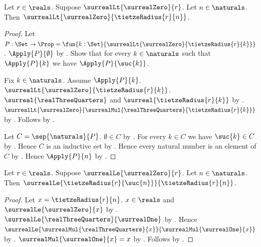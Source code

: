 \begin{theorem}\label{tietze_radius_positive}
    Let $r\in\reals$.
    Suppose $\surrealLt{\surrealZero}{r}$.
    Let $n\in\naturals$.
    Then $\surrealLt{\surrealZero}{\tietzeRadius{r}{n}}$.
\end{theorem}
\begin{proof}
    Let $P:\Set\to\Prop=\fun{k:\Set}{
        \surrealLt{\surrealZero}{\tietzeRadius{r}{k}}}$.
    $\Apply{P}{\emptyset}$ by .
    Show that for every $k\in\naturals$ such that $\Apply{P}{k}$
        we have $\Apply{P}{\suc{k}}$.
    \begin{subproof}
        Fix $k\in\naturals$.
        Assume $\Apply{P}{k}$.
        $\surrealLt{\surrealZero}{\tietzeRadius{r}{k}}$.
        $\surreal{\realThreeQuarters}$ and
            $\surreal{\tietzeRadius{r}{k}}$
            by
            .
        $\surrealLt{\surrealZero}
            {\surrealMul{\realThreeQuarters}{\tietzeRadius{r}{k}}}$
            by .
        Follows by .
    \end{subproof}
    Let $C=\sep{\naturals}{P}$.
    $\emptyset\in C$ by .
    For every $k\in C$ we have $\suc{k}\in C$
        by .
    Hence $C$ is an inductive set by .
    Hence every natural number is an element of $C$
        by .
    Hence $\Apply{P}{n}$ by .
\end{proof}

\begin{proposition}\label{tietze_radius_successor_le}
    Let $r\in\reals$.
    Suppose $\surrealLe{\surrealZero}{r}$.
    Let $n\in\naturals$.
    Then $\surrealLe{\tietzeRadius{r}{\suc{n}}}
        {\tietzeRadius{r}{n}}$.
\end{proposition}
\begin{proof}
    Let $x=\tietzeRadius{r}{n}$.
    $x\in\reals$ and $\surrealLe{\surrealZero}{x}$
        by .
    $\surrealLe{\realThreeQuarters}{\surrealOne}$
        by
        .
    Hence $\surrealLe{\surrealMul{\realThreeQuarters}{x}}
        {\surrealMul{\surrealOne}{x}}$
        by
        .
    $\surrealMul{\surrealOne}{x}=x$
        by .
    Follows by .
\end{proof}


